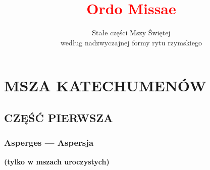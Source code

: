 \documentclass[8pt,titlepage]{article}
\title{\textcolor{red}{Ordo Missae}}
\author{Stałe części Mszy Świętej\\według nadzwyczajnej formy rytu rzymskiego }
\date{}
\newcommand{\negr}[1]{\textbf{#1}}
\begin{document}
	\maketitle
	\clearpage
	\tableofcontents
	\clearpage
	
	\section{MSZA KATECHUMENÓW}
	
	\subsection{CZĘŚĆ PIERWSZA}
	
	\subsubsection{Asperges --- Aspersja}
	\negr{(tylko w mszach uroczystych)}
	
\end{document}
